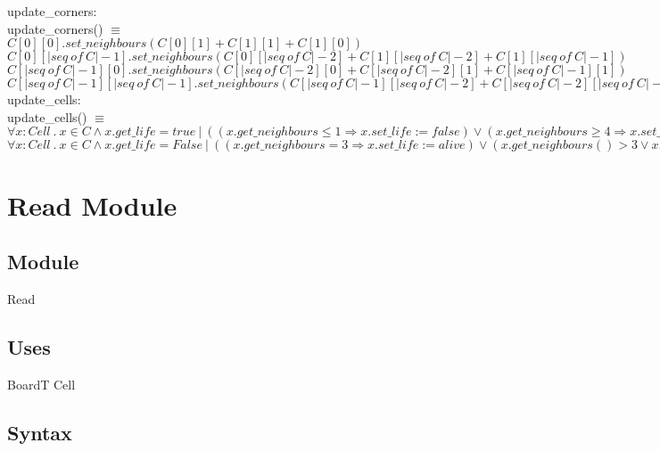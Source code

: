 \documentclass[12pt]{article}
\begin{document}
\noindent
update\_corners: \\
update\_corners() $\equiv$ \\
$C[0][0].set\_neighbours(C[0][1] + C[1][1] + C[1][0])$\\
$C[0][|seq \ of \ C|-1].set\_neighbours(C[0][|seq \ of \ C|-2] + C[1][|seq \ of \ C|-2] + C[1][|seq \ of \ C|-1])$\\
$C[|seq \ of \ C|-1][0].set\_neighbours(C[|seq \ of \ C|-2][0] + C[|seq \ of \ C|-2][1] + C[|seq \ of \ C|-1][1])$\\
$C[|seq \ of \ C|-1][|seq \ of \ C|-1].set\_neighbours(C[|seq \ of \ C|-1][|seq \ of \ C|-2] + C[|seq \ of \ C|-2][|seq \ of \ C|-2] + C[|seq \ of \ C|-2][|seq \ of \ C|-1])$\\

\noindent
update\_cells:\\
update\_cells() $\equiv$ \\
$\forall x : Cell \ . \ x \in C \land x.get\_life = true\ | \ ((x.get\_neighbours \leq 1 \Rightarrow x.set\_life := false) \lor 
(x.get\_neighbours \ge 4 \Rightarrow x.set\_life := false) \lor
(x.get\_neighbours > 1 \land x.get\_neighbours < 4 \Rightarrow x.set\_life := true))$ \\

$\forall x : Cell \ . \ x \in C \land x.get\_life = False \ | \ 
((x.get\_neighbours = 3 \Rightarrow x.set\_life := alive) \lor
(x.get\_neighbours() > 3 \lor x.get\_neighbours < 3 \Rightarrow x.set\_life() := false))$

\newpage

\section* {Read Module}

\subsection*{Module}

Read

\subsection* {Uses}

BoardT
Cell

\subsection* {Syntax}
\end{document}
